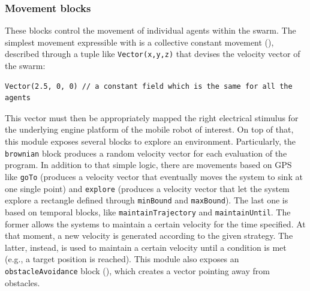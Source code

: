 \subsubsection{Movement blocks}\label{coordination2023-macro:subsec:base}
%
These blocks control the movement of individual agents within the swarm. 
The simplest movement expressible 
 with \MacroSwarm{} is a collective constant movement (), 
 described through a tuple 
 like \lstinline|Vector(x,y,z)|
 that devises the velocity vector of the swarm:
\begin{lstlisting}
Vector(2.5, 0, 0) // a constant field which is the same for all the agents
\end{lstlisting}
This vector must then be appropriately mapped 
 the right electrical stimulus for the underlying engine platform
 of the mobile robot of interest.
On top of that, 
 this module exposes several blocks to explore an environment. 
%
Particularly, the \lstinline|brownian| block produces a random velocity vector 
 for each evaluation of the program. 
%
In addition to that simple logic, 
 there are movements based on GPS like \lstinline|goTo| 
 (produces a velocity vector that eventually moves the system to sink at one single point)
 and \lstinline|explore| 
 (produces a velocity vector that let the system explore a rectangle defined through \lstinline|minBound| and \lstinline|maxBound|).
%
The last one is based on temporal blocks, 
  like \lstinline|maintainTrajectory| and \lstinline|maintainUntil|.
%
The former allows the systems to maintain a certain velocity for the time specified. 
 At that moment, a new velocity is generated according to the given strategy. 
% 
The latter, instead, is used to maintain a certain velocity until a condition is met 
 (e.g., a target position is reached).
%
This module also exposes an \lstinline|obstacleAvoidance| block (), which creates a vector pointing away from obstacles.

